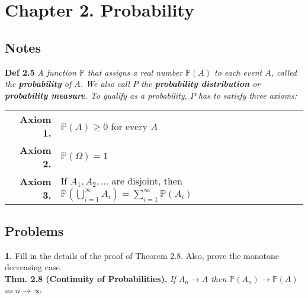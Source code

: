 \documentclass{paper}
\newcommand{\pr}{\mathbb{P}}
\begin{document}
\section*{Chapter 2. Probability}

\subsection{Notes}
\vspace{0.25 in}
\textbf{Def 2.5} \emph{A function $\pr$ that assigns a real number $\pr(A)$ to each event $A$, called the \textbf{probability} of $A$. We also call $P$ the \textbf{probability distribution} or \textbf{probability measure}. To qualify as a probability, $P$ has to satisfy three axioms:}\\

\begin{tabular}{rl}
\qquad \textbf{Axiom 1.} & $\pr(A)\ge 0$ for every $A$\\
\qquad \textbf{Axiom 2.} & $\pr(\Omega)=1$\\
\qquad \textbf{Axiom 3.} & If $A_1, A_2, \ldots$ are disjoint, then $\pr(\bigcup_{i=1}^{\infty}A_i) = \sum_{i=1}^{\infty}\pr(A_i)$\\
\end{tabular}
\vspace{0.25 in}


\subsection{Problems}
\textbf{1.} Fill in the details of the proof of Theorem 2.8. Also, prove the monotone decreasing case.\\

\textbf{Thm. 2.8 (Continuity of Probabilities).} \emph{If $A_n\to A$ then $\pr(A_n)\to \pr(A)$ as $n\to\infty$.}
\end{document}
